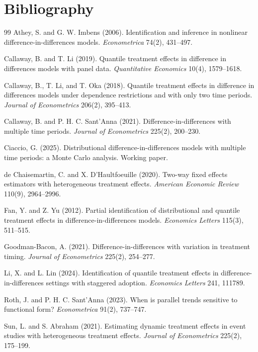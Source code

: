 \documentclass[11pt]{article}
\theoremstyle{definition}
\theoremstyle{plain}
\theoremstyle{remark}
\begin{document}
\section*{Bibliography}
\begin{thebibliography}{99}
Athey, S. and G. W. Imbens (2006).
\newblock Identification and inference in nonlinear difference-in-differences models.
\newblock \emph{Econometrica} 74(2), 431--497.

Callaway, B. and T. Li (2019).
\newblock Quantile treatment effects in difference in differences models with panel data.
\newblock \emph{Quantitative Economics} 10(4), 1579--1618.

Callaway, B., T. Li, and T. Oka (2018).
\newblock Quantile treatment effects in difference in differences models under dependence restrictions and with only two time periods.
\newblock \emph{Journal of Econometrics} 206(2), 395--413.

Callaway, B. and P. H. C. Sant'Anna (2021).
\newblock Difference-in-differences with multiple time periods.
\newblock \emph{Journal of Econometrics} 225(2), 200--230.

Ciaccio, G. (2025).
\newblock Distributional difference-in-differences models with multiple time periods: a Monte Carlo analysis.
\newblock Working paper.

de Chaisemartin, C. and X. D'Haultfoeuille (2020).
\newblock Two-way fixed effects estimators with heterogeneous treatment effects.
\newblock \emph{American Economic Review} 110(9), 2964--2996.

Fan, Y. and Z. Yu (2012).
\newblock Partial identification of distributional and quantile treatment effects in difference-in-differences models.
\newblock \emph{Economics Letters} 115(3), 511--515.

Goodman-Bacon, A. (2021).
\newblock Difference-in-differences with variation in treatment timing.
\newblock \emph{Journal of Econometrics} 225(2), 254--277.

Li, X. and L. Lin (2024).
\newblock Identification of quantile treatment effects in difference-in-differences settings with staggered adoption.
\newblock \emph{Economics Letters} 241, 111789.

Roth, J. and P. H. C. Sant'Anna (2023).
\newblock When is parallel trends sensitive to functional form?
\newblock \emph{Econometrica} 91(2), 737--747.

Sun, L. and S. Abraham (2021).
\newblock Estimating dynamic treatment effects in event studies with heterogeneous treatment effects.
\newblock \emph{Journal of Econometrics} 225(2), 175--199.
\end{thebibliography}
\end{document}
